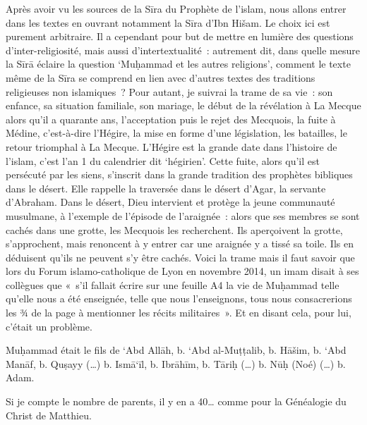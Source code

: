 Après avoir vu les sources de la Sīra du Prophète de l'islam, nous
allons entrer dans les textes en ouvrant notamment la Sīra d'Ibn Hišam.
Le choix ici est purement arbitraire. Il a cependant pour but de mettre
en lumière des questions d'inter-religiosité, mais aussi
d'intertextualité~: autrement dit, dans quelle mesure la Sīrā éclaire la
question `Muḥammad et les autres religions', comment le texte même de la
Sīra se comprend en lien avec d'autres textes des traditions religieuses
non islamiques~? Pour autant, je suivrai la trame de sa vie~: son
enfance, sa situation familiale, son mariage, le début de la révélation
à La Mecque alors qu'il a quarante ans, l'acceptation puis le rejet des
Mecquois, la fuite à Médine, c'est-à-dire l'Hégire, la mise en forme
d'une législation, les batailles, le retour triomphal à La Mecque.
L'Hégire est la grande date dans l'histoire de l'islam, c'est l'an 1 du
calendrier dit `hégirien'. Cette fuite, alors qu'il est persécuté par
les siens, s'inscrit dans la grande tradition des prophètes bibliques
dans le désert. Elle rappelle la traversée dans le désert d'Agar, la
servante d'Abraham. Dans le désert, Dieu intervient et protège la jeune
communauté musulmane, à l'exemple de l'épisode de l'araignée~: alors que
ses membres se sont cachés dans une grotte, les Mecquois les
recherchent. Ils aperçoivent la grotte, s'approchent, mais renoncent à y
entrer car une araignée y a tissé sa toile. Ils en déduisent qu'ils ne
peuvent s'y être cachés. Voici la trame mais il faut savoir que lors du
Forum islamo-catholique de Lyon en novembre 2014, un imam disait à ses
collègues que «~s'il fallait écrire sur une feuille A4 la vie de
Muḥammad telle qu'elle nous a été enseignée, telle que nous
l'enseignons, tous nous consacrerions les ¾ de la page à mentionner les
récits militaires~». Et en disant cela, pour lui, c'était un problème.


Muḥammad était le fils de `Abd Allāh, b. `Abd al-Muṭṭalib, b. Hāšim, b.
`Abd Manāf, b. Quṣayy (\ldots) b. Ismā`īl, b. Ibrāhīm, b. Tāriḥ (\ldots)
b. Nūḥ (Noé) (\ldots) b. Adam.

Si je compte le nombre de parents, il y en a 40\ldots{} comme pour la
Généalogie du Christ de Matthieu.


